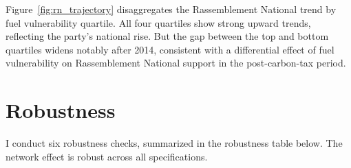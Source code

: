 \documentclass[12pt]{article}
\newcommand{\rn}{Rassemblement National}
\begin{document}
Figure~\ref{fig:rn_trajectory} disaggregates the \rn{} trend by fuel vulnerability quartile. All four quartiles show strong upward trends, reflecting the party's national rise. But the gap between the top and bottom quartiles widens notably after 2014, consistent with a differential effect of fuel vulnerability on \rn{} support in the post-carbon-tax period.



\section{Robustness}
\label{sec:robustness}

I conduct six robustness checks, summarized in the robustness table below. The network effect is robust across all specifications.
\end{document}
